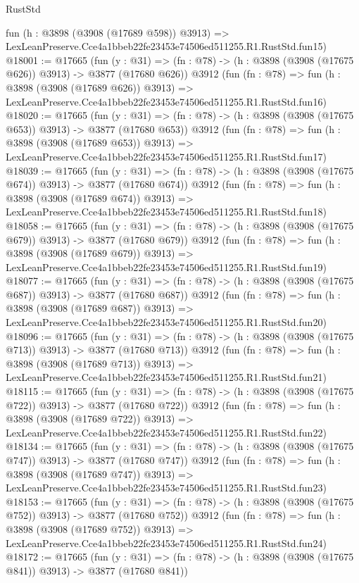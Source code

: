 \begin{lexlean}{RustStd}
\begin{coremodule}
    fun (h : @3898 (@3908 (@17689 @598)) @3913) =>
    LexLeanPreserve.Cce4a1bbeb22fe23453e74506ed511255.R1.RustStd.fun15)
@18001 := @17665
    (fun (y : @31) => (fn : @78) -> (h : @3898 (@3908 (@17675 @626)) @3913) -> @3877 (@17680 @626))
    @3912
    (fun (fn : @78) =>
    fun (h : @3898 (@3908 (@17689 @626)) @3913) =>
    LexLeanPreserve.Cce4a1bbeb22fe23453e74506ed511255.R1.RustStd.fun16)
@18020 := @17665
    (fun (y : @31) => (fn : @78) -> (h : @3898 (@3908 (@17675 @653)) @3913) -> @3877 (@17680 @653))
    @3912
    (fun (fn : @78) =>
    fun (h : @3898 (@3908 (@17689 @653)) @3913) =>
    LexLeanPreserve.Cce4a1bbeb22fe23453e74506ed511255.R1.RustStd.fun17)
@18039 := @17665
    (fun (y : @31) => (fn : @78) -> (h : @3898 (@3908 (@17675 @674)) @3913) -> @3877 (@17680 @674))
    @3912
    (fun (fn : @78) =>
    fun (h : @3898 (@3908 (@17689 @674)) @3913) =>
    LexLeanPreserve.Cce4a1bbeb22fe23453e74506ed511255.R1.RustStd.fun18)
@18058 := @17665
    (fun (y : @31) => (fn : @78) -> (h : @3898 (@3908 (@17675 @679)) @3913) -> @3877 (@17680 @679))
    @3912
    (fun (fn : @78) =>
    fun (h : @3898 (@3908 (@17689 @679)) @3913) =>
    LexLeanPreserve.Cce4a1bbeb22fe23453e74506ed511255.R1.RustStd.fun19)
@18077 := @17665
    (fun (y : @31) => (fn : @78) -> (h : @3898 (@3908 (@17675 @687)) @3913) -> @3877 (@17680 @687))
    @3912
    (fun (fn : @78) =>
    fun (h : @3898 (@3908 (@17689 @687)) @3913) =>
    LexLeanPreserve.Cce4a1bbeb22fe23453e74506ed511255.R1.RustStd.fun20)
@18096 := @17665
    (fun (y : @31) => (fn : @78) -> (h : @3898 (@3908 (@17675 @713)) @3913) -> @3877 (@17680 @713))
    @3912
    (fun (fn : @78) =>
    fun (h : @3898 (@3908 (@17689 @713)) @3913) =>
    LexLeanPreserve.Cce4a1bbeb22fe23453e74506ed511255.R1.RustStd.fun21)
@18115 := @17665
    (fun (y : @31) => (fn : @78) -> (h : @3898 (@3908 (@17675 @722)) @3913) -> @3877 (@17680 @722))
    @3912
    (fun (fn : @78) =>
    fun (h : @3898 (@3908 (@17689 @722)) @3913) =>
    LexLeanPreserve.Cce4a1bbeb22fe23453e74506ed511255.R1.RustStd.fun22)
@18134 := @17665
    (fun (y : @31) => (fn : @78) -> (h : @3898 (@3908 (@17675 @747)) @3913) -> @3877 (@17680 @747))
    @3912
    (fun (fn : @78) =>
    fun (h : @3898 (@3908 (@17689 @747)) @3913) =>
    LexLeanPreserve.Cce4a1bbeb22fe23453e74506ed511255.R1.RustStd.fun23)
@18153 := @17665
    (fun (y : @31) => (fn : @78) -> (h : @3898 (@3908 (@17675 @752)) @3913) -> @3877 (@17680 @752))
    @3912
    (fun (fn : @78) =>
    fun (h : @3898 (@3908 (@17689 @752)) @3913) =>
    LexLeanPreserve.Cce4a1bbeb22fe23453e74506ed511255.R1.RustStd.fun24)
@18172 := @17665
    (fun (y : @31) => (fn : @78) -> (h : @3898 (@3908 (@17675 @841)) @3913) -> @3877 (@17680 @841))

\end{coremodule}
\end{lexlean}
